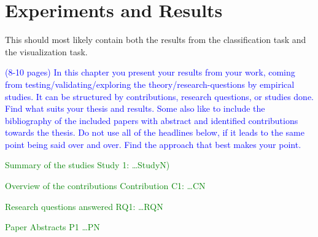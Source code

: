 \chapter{Experiments and Results}

This should most likely contain both the results from the classification task and the visualization task.

\textcolor{blue}{(8-10 pages) In this chapter you present your results from your work, coming from 
testing/validating/exploring the theory/research-questions by empirical studies. It can be structured by contributions, 
research questions, or studies done. Find what suits your thesis and results. Some also like to include the 
bibliography of the included papers with abstract and identified contributions towards the thesis. Do not use all of 
the headlines below, if it leads to the same point being said over and over. Find the approach that best makes your 
point.}

\textcolor{green}{Summary of the studies Study 1: \ldots StudyN)}

\textcolor{green}{Overview of the contributions Contribution C1: \ldots CN}

\textcolor{green}{Research questions answered RQ1: \ldots RQN}

\textcolor{green}{Paper Abstracts P1 \ldots PN}